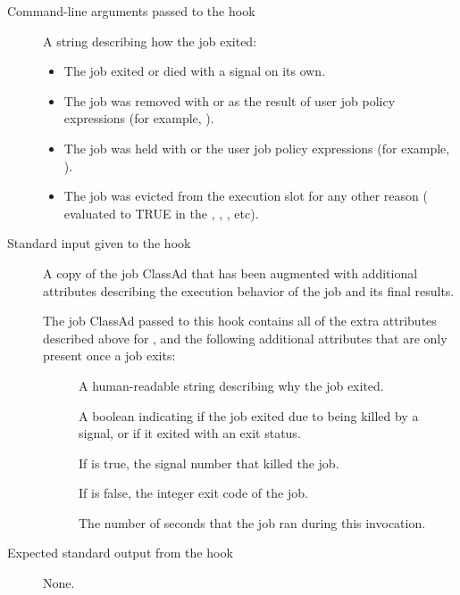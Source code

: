 \begin{itemize}
\begin{description}
\item[Command-line arguments passed to the hook]
  A string describing how the job exited:
  \begin{itemize}
    \item \verb@exit@ The job exited or died with a signal on its own.
    \item \verb@remove@ The job was removed with  or as the result of
    user job policy expressions (for example, ).
    \item \verb@hold@ The job was held with  or the
    user job policy expressions (for example, ).
    \item \verb@evict@ The job was evicted from the execution slot for
    any other reason ( evaluated to TRUE in the
    , , , etc).
  \end{itemize}

\item[Standard input given to the hook]
  A copy of the job ClassAd that has been augmented with additional
  attributes describing the execution behavior of the job and its
  final results.

The job ClassAd passed to this hook contains all of the extra
attributes described above for , and
the following additional attributes that are only present once a job
exits:
\begin{description}
\item[]
  A human-readable string describing why the job exited.

\item[]
  A boolean indicating if the job exited due to being killed by a
  signal, or if it exited with an exit status.

\item[]
  If  is true, the signal number that killed the job.

\item[]
  If  is false, the integer exit code of the job.

\item[]
  The number of seconds that the job ran during this invocation.
\end{description}

\item[Expected standard output from the hook]
  None.


\end{description}
\end{itemize}
